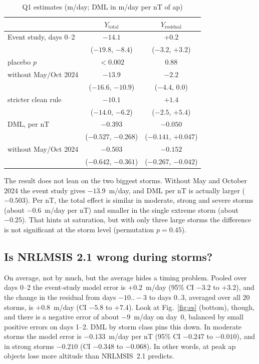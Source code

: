 \begin{table}[t]
\caption{Q1 estimates (m/day; DML in m/day per nT of ap)}
\label{tab:q1}
\centering
\small
\begin{tabular}{@{}lcc@{}}
\toprule
 & $Y_{\text{total}}$ & $Y_{\text{residual}}$ \\
\midrule
Event study, days 0--2 & $-14.1$ & $+0.2$ \\
 & {\scriptsize($-19.8$, $-8.4$)} & {\scriptsize($-3.2$, $+3.2$)} \\
\quad placebo $p$ & $<0.002$ & 0.88 \\
\quad without May/Oct 2024 & $-13.9$ & $-2.2$ \\
 & {\scriptsize($-16.6$, $-10.9$)} & {\scriptsize($-4.4$, $0.0$)} \\
\quad stricter clean rule & $-10.1$ & $+1.4$ \\
 & {\scriptsize($-14.0$, $-6.2$)} & {\scriptsize($-2.5$, $+5.4$)} \\
DML, per nT & $-0.393$ & $-0.050$ \\
 & {\scriptsize($-0.527$, $-0.268$)} & {\scriptsize($-0.141$, $+0.047$)} \\
\quad without May/Oct 2024 & $-0.503$ & $-0.152$ \\
 & {\scriptsize($-0.642$, $-0.361$)} & {\scriptsize($-0.267$, $-0.042$)} \\
\bottomrule
\end{tabular}
\end{table}

The result does not lean on the two biggest storms. Without May and October 2024 the event study
gives $-13.9$~m/day, and DML per nT is actually larger ($-0.503$). Per nT, the total effect is
similar in moderate, strong and severe storms (about $-0.6$~m/day per nT) and smaller in the
single extreme storm (about $-0.25$). That hints at saturation, but with only three large storms
the difference is not significant at the storm level (permutation $p=0.45$).

\subsection{Is NRLMSIS 2.1 wrong during storms?}
\label{sec:modelerror}
On average, not by much, but the average hides a timing problem. Pooled over days 0--2 the
event-study model error is $+0.2$~m/day (95\% CI $-3.2$ to $+3.2$), and the change in the
residual from days $-10..-3$ to days $0..3$, averaged over all 20 storms, is $+0.8$~m/day (CI
$-5.8$ to $+7.4$). Look at Fig.~\ref{fig:es} (bottom), though, and there is a negative error of
about $-9$~m/day on day~0, balanced by small positive errors on days 1--2. DML by storm class
pins this down. In moderate storms the model error is $-0.133$~m/day per nT (95\% CI $-0.247$
to $-0.010$), and in strong storms $-0.210$ (CI $-0.348$ to $-0.068$). In other words, at peak
ap objects lose more altitude than NRLMSIS~2.1 predicts.

